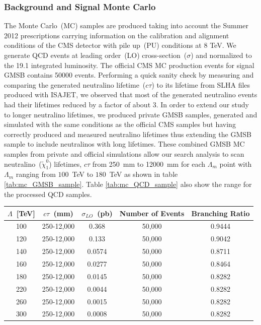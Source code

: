 \subsubsection*{Background and Signal Monte Carlo}
The Monte Carlo~(MC) samples are produced taking into account the Summer 2012 prescriptions carrying information on the calibration and alignment conditions of the CMS detector with pile up~(PU) conditions at 8 TeV.
We generate QCD events at leading order~(LO) cross-section~($\sigma$) and normalized to the 19.1 \fbinv integrated luminosity. The official CMS MC production events for signal GMSB contains 50000 events. Performing a quick sanity check by measuring and comparing the generated neutralino lifetime~($c\tau$) to its lifetime from SLHA files produced with ISAJET, we observed that most of the generated neutralino events had their lifetimes reduced by a factor of about 3. In order to extend our study to longer neutralino lifetimes, we produced private GMSB samples, generated and simulated with the same conditions as the official CMS samples but having correctly produced and measured neutralino lifetimes thus extending the GMSB sample to include neutralinos with long lifetimes.
  These combined GMSB MC samples from private and official simulations allow our search analysis to scan neutralino~($\tilde{\chi}^{0}_{1}$) lifetimes, $c\tau$ from 250~mm to 12000~mm for each $\Lambda_{m}$ point with $\Lambda_{m}$ ranging from $100$~TeV to $180$~TeV as shown in table \ref{tab:mc_GMSB_sample}. Table \ref{tab:mc_QCD_sample} also show the \pt range for the processed QCD samples.

\begin{center}
\centering
\begin{tabular}{|c c c c c|}
        \hline
        $\Lambda$~[TeV] & $c\tau$~(mm) & $\sigma_{LO}$~(pb) & \bfseries{Number of Events} & \bfseries{Branching Ratio}\\
       \hline
       100 & 250-12,000  & 0.368  & 50,000 & 0.9444\\
       120 & 250-12,000  & 0.133  & 50,000 & 0.9042\\
       140 & 250-12,000  & 0.0574 & 50,000 & 0.8711\\
       160 & 250-12,000  & 0.0277 & 50,000 & 0.8464\\
       180 & 250-12,000  & 0.0145 & 50,000 & 0.8282\\
       220 & 250-12,000  & 0.0044 & 50,000 & 0.8282\\
       260 & 250-12,000  & 0.0015 & 50,000 & 0.8282\\
       300 & 250-12,000  & 0.0008 & 50,000 & 0.8282\\
       \hline
       \end{tabular}  
\label{tab:mc_GMSB_sample}
\end{center}

